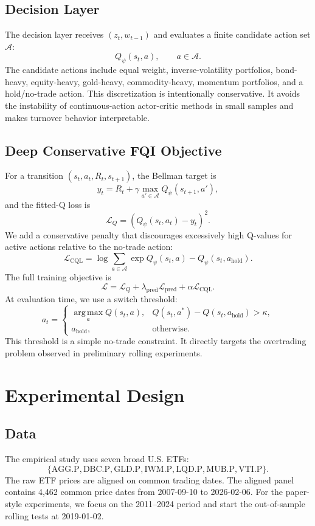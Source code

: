 \documentclass[11pt]{article}
\newcommand{\argmax}{\operatorname*{arg\,max}}
\begin{document}
\subsection{Decision Layer}

The decision layer receives $(z_t,w_{t-1})$ and evaluates a finite candidate action set $\mathcal{A}$:
\[
Q_\psi(s_t,a), \qquad a \in \mathcal{A}.
\]
The candidate actions include equal weight, inverse-volatility portfolios, bond-heavy, equity-heavy, gold-heavy, commodity-heavy, momentum portfolios, and a hold/no-trade action. This discretization is intentionally conservative. It avoids the instability of continuous-action actor-critic methods in small samples and makes turnover behavior interpretable.

\subsection{Deep Conservative FQI Objective}

For a transition $(s_t,a_t,R_t,s_{t+1})$, the Bellman target is
\[
y_t
=
R_t
+
\gamma \max_{a'\in\mathcal{A}} Q_{\bar{\psi}}(s_{t+1},a'),
\]
and the fitted-Q loss is
\[
\mathcal{L}_{Q}
=
\left(Q_{\psi}(s_t,a_t)-y_t\right)^2.
\]
We add a conservative penalty that discourages excessively high Q-values for active actions relative to the no-trade action:
\[
\mathcal{L}_{\mathrm{CQL}}
=
\log\sum_{a\in\mathcal{A}}\exp Q_\psi(s_t,a)
-
Q_\psi(s_t,a_{\mathrm{hold}}).
\]
The full training objective is
\[
\mathcal{L}
=
\mathcal{L}_Q
+
\lambda_{\mathrm{pred}}\mathcal{L}_{\mathrm{pred}}
+
\alpha\mathcal{L}_{\mathrm{CQL}}.
\]
At evaluation time, we use a switch threshold:
\[
a_t =
\begin{cases}
\argmax_a Q(s_t,a), & 
Q(s_t,a^*) - Q(s_t,a_{\mathrm{hold}}) > \kappa, \\
a_{\mathrm{hold}}, & \text{otherwise}.
\end{cases}
\]
This threshold is a simple no-trade constraint. It directly targets the overtrading problem observed in preliminary rolling experiments.

\section{Experimental Design}

\subsection{Data}

The empirical study uses seven broad U.S. ETFs:
\[
\{\text{AGG.P},\text{DBC.P},\text{GLD.P},\text{IWM.P},\text{LQD.P},\text{MUB.P},\text{VTI.P}\}.
\]
The raw ETF prices are aligned on common trading dates. The aligned panel contains 4,462 common price dates from 2007-09-10 to 2026-02-06. For the paper-style experiments, we focus on the 2011--2024 period and start the out-of-sample rolling tests at 2019-01-02.
\end{document}
